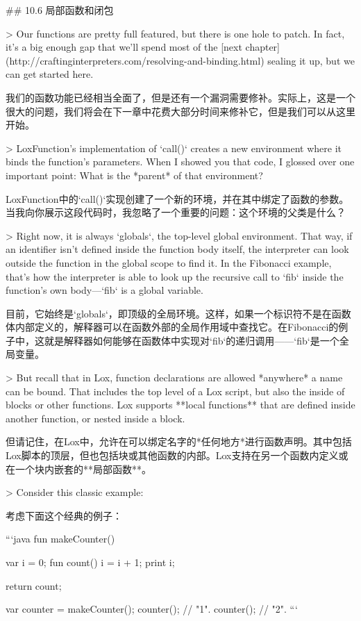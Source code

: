 \documentclass[cn,11pt,chinese]{elegantbook}
\begin{document}
{{{{{{{## 10.6 局部函数和闭包

> Our functions are pretty full featured, but there is one hole to patch. In fact, it’s a big enough gap that we’ll spend most of the [next chapter](http://craftinginterpreters.com/resolving-and-binding.html) sealing it up, but we can get started here.

我们的函数功能已经相当全面了，但是还有一个漏洞需要修补。实际上，这是一个很大的问题，我们将会在下一章中花费大部分时间来修补它，但是我们可以从这里开始。

> LoxFunction’s implementation of `call()` creates a new environment where it binds the function’s parameters. When I showed you that code, I glossed over one important point: What is the *parent* of that environment?

LoxFunction中的`call()`实现创建了一个新的环境，并在其中绑定了函数的参数。当我向你展示这段代码时，我忽略了一个重要的问题：这个环境的父类是什么？

> Right now, it is always `globals`, the top-level global environment. That way, if an identifier isn’t defined inside the function body itself, the interpreter can look outside the function in the global scope to find it. In the Fibonacci example, that’s how the interpreter is able to look up the recursive call to `fib` inside the function’s own body—`fib` is a global variable.

目前，它始终是`globals`，即顶级的全局环境。这样，如果一个标识符不是在函数体内部定义的，解释器可以在函数外部的全局作用域中查找它。在Fibonacci的例子中，这就是解释器如何能够在函数体中实现对`fib`的递归调用——`fib`是一个全局变量。

> But recall that in Lox, function declarations are allowed *anywhere* a name can be bound. That includes the top level of a Lox script, but also the inside of blocks or other functions. Lox supports **local functions** that are defined inside another function, or nested inside a block.

但请记住，在Lox中，允许在可以绑定名字的*任何地方*进行函数声明。其中包括Lox脚本的顶层，但也包括块或其他函数的内部。Lox支持在另一个函数内定义或在一个块内嵌套的**局部函数**。

> Consider this classic example:

考虑下面这个经典的例子：

```java
fun makeCounter() {
  var i = 0;
  fun count() {
    i = i + 1;
    print i;
  }

  return count;
}

var counter = makeCounter();
counter(); // "1".
counter(); // "2".
```

}}}}}}}
\end{document}
